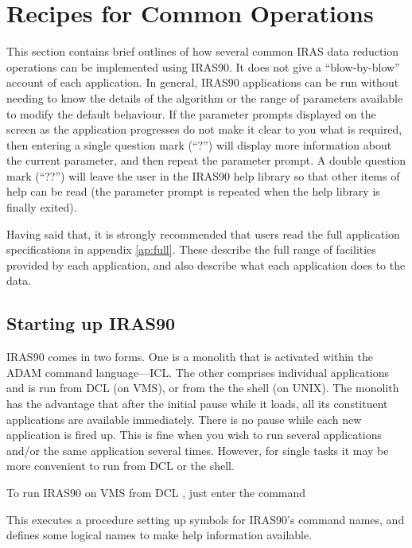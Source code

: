 \documentclass[11pt,nolof,noabs]{starlink}
\begin{document}
\section{Recipes for Common Operations}
This section contains brief outlines of how several common {\small IRAS} data
reduction operations can be implemented using {\small IRAS90}. It does not give
a ``blow-by-blow'' account of each application. In general, {\small IRAS90}
applications can be run without needing to know the details of the algorithm or
the range of parameters available to modify the default behaviour. If the
parameter prompts displayed on the screen as the application progresses do not
make it clear to you what is required, then entering a single question mark
(``?'') will display more information about the current parameter, and then
repeat the parameter prompt. A double question mark (``??'') will leave the user
in the {\small IRAS90} help library so that other items of help can be read (the
parameter prompt is repeated when the help library is finally exited).

Having said that, it is strongly recommended that users read the full
application specifications in appendix \ref{ap:full}. These describe the full
range of facilities provided by each application, and also describe what each
application does to the data.

\subsection{Starting up IRAS90}
{\small IRAS90} comes in two forms.  One is a monolith that is activated within
the {\small ADAM} command language---{\small ICL}.  The other comprises
individual applications and is run from {\small DCL} (on {\small VMS}), or from
the the shell (on {\small UNIX}).  The monolith has the advantage that after the
initial pause while it loads, all its constituent applications are available
immediately.  There is no pause while each new application is fired up.  This is
fine when you wish to run several applications and/or the same application
several times. However, for single tasks it may be more convenient to run from
{\small DCL} or the shell.

To run {\small IRAS90} on {\small VMS} from {\small DCL} , just enter the
command

\small
{}
\normalsize

This executes a procedure setting up symbols for {\small IRAS90}'s command
names, and defines some logical names to make help information available.
\end{document}
